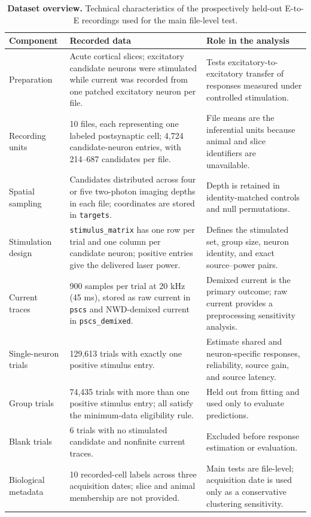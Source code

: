 \documentclass[10pt,twocolumn]{article}
\begin{document}
\begin{table}[t]
  \centering
  \caption{\textbf{Dataset overview.} Technical characteristics of the
  prospectively held-out E-to-E recordings used for the main file-level test.}
  \label{tab:dataset}
  \begin{tabular}{@{}p{}p{}p{}@{}}
    \toprule
    Component & Recorded data & Role in the analysis \\
    \midrule
    Preparation & Acute cortical slices; excitatory candidate neurons were
    stimulated while current was recorded from one patched excitatory neuron
    per file. & Tests excitatory-to-excitatory transfer of responses measured
    under controlled stimulation. \\
    Recording units & 10 files, each representing one labeled postsynaptic
    cell; 4,724 candidate-neuron entries, with 214--687 candidates per file. &
    File means are the inferential units because animal and slice identifiers
    are unavailable. \\
    Spatial sampling & Candidates distributed across four or five two-photon
    imaging depths in each file; coordinates are stored in
    \texttt{targets}. & Depth is retained in identity-matched controls and
    null permutations. \\
    Stimulation design & \texttt{stimulus\_matrix} has one row per trial and
    one column per candidate neuron; positive entries give the delivered laser
    power. & Defines the stimulated set, group size, neuron identity, and exact
    source--power pairs. \\
    Current traces & 900 samples per trial at 20 kHz (45 ms), stored as raw
    current in \texttt{pscs} and NWD-demixed current in
    \texttt{pscs\_demixed}. & Demixed current is the primary outcome; raw
    current provides a preprocessing sensitivity analysis. \\
    Single-neuron trials & 129,613 trials with exactly one positive stimulus
    entry. & Estimate shared and neuron-specific responses, reliability,
    source gain, and source latency. \\
    Group trials & 74,435 trials with more than one positive stimulus entry;
    all satisfy the minimum-data eligibility rule. & Held out from fitting and
    used only to evaluate predictions. \\
    Blank trials & 6 trials with no stimulated candidate and nonfinite current
    traces. & Excluded before response estimation or evaluation. \\
    Biological metadata & 10 recorded-cell labels across three acquisition
    dates; slice and animal membership are not provided. & Main tests are
    file-level; acquisition date is used only as a conservative clustering
    sensitivity. \\
    \bottomrule
  \end{tabular}
\end{table}
\end{document}
